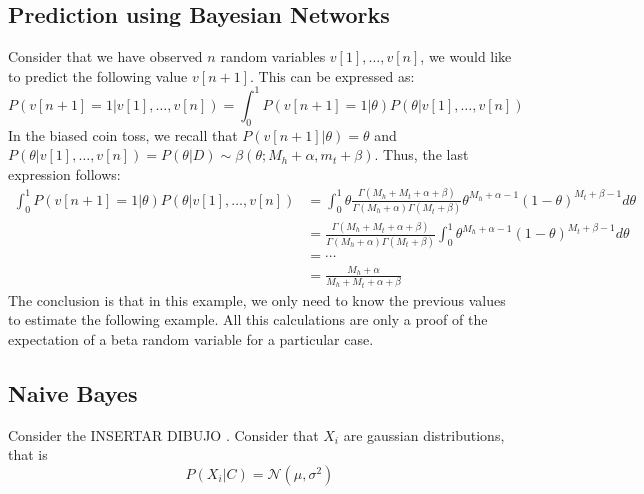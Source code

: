 \subsection{Prediction using Bayesian Networks}

Consider that we have observed \(n\) random variables \(v[1],\dots,v[n]\), we would like to predict the following value \(v[n+1]\). This can be expressed as:
\[
P(v[n+1] = 1|v[1],\dots,v[n]) = \int_{0}^{1}P(v[n+1] = 1|\theta)P(\theta | v[1],\dots,v[n])
\]
In the biased coin toss, we recall that \(P(v[n+1]|\theta) = \theta\) and \(P(\theta|v[1],\dots ,v[n]) = P(\theta|D) \sim \beta(\theta ; M_{h} + \alpha, m_{t}+\beta)\). Thus, the last expression follows:
\begin{align*}
  \int_{0}^{1}P(v[n+1] = 1|\theta)P(\theta | v[1],\dots,v[n]) & = \int_{0}^{1}\theta \frac{\Gamma(M_{h} + M_{t} + \alpha + \beta)}{\Gamma(M_{h} + \alpha)\Gamma(M_{t} + \beta)} \theta^{M_{h}+ \alpha -1}(1-\theta)^{M_{t}+\beta - 1} d\theta\\
                       & =  \frac{\Gamma(M_{h} + M_{t} + \alpha + \beta)}{\Gamma(M_{h} + \alpha)\Gamma(M_{t} + \beta)} \int_{0}^{1} \theta^{M_{h}+ \alpha -1}(1-\theta)^{M_{t}+\beta - 1} d\theta \\
                       & = \cdots \\
                         & = \frac{M_{h} + \alpha}{M_{h} + M_{t}+ \alpha + \beta}
\end{align*}
The conclusion is that in this example, we only need to know the previous values to estimate the following example. All this calculations are only a proof of the expectation of a beta random variable for a particular case.


\subsection{Naive Bayes}

Consider the INSERTAR DIBUJO . Consider that \(X_{i}\) are gaussian distributions, that is
\[
P(X_{i}|C) = \mathcal N(\mu,\sigma^{2})
\]

